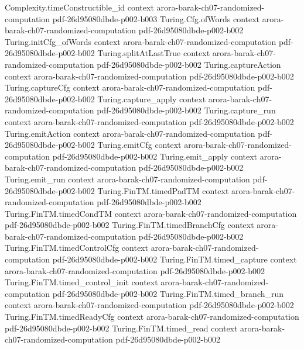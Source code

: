 \begin{theorem}
  {Complexity.timeConstructible_id}
  {context}
  {arora-barak-ch07-randomized-computation}
  {pdf-26d95080dbde-p002-b003}
\proofstep
  {Turing.Cfg.ofWords}
  {context}
  {arora-barak-ch07-randomized-computation}
  {pdf-26d95080dbde-p002-b002}
\proofstep
  {Turing.initCfg_ofWords}
  {context}
  {arora-barak-ch07-randomized-computation}
  {pdf-26d95080dbde-p002-b002}
\proofstep
  {Turing.splitAtLastTrue}
  {context}
  {arora-barak-ch07-randomized-computation}
  {pdf-26d95080dbde-p002-b002}
\proofstep
  {Turing.captureAction}
  {context}
  {arora-barak-ch07-randomized-computation}
  {pdf-26d95080dbde-p002-b002}
\proofstep
  {Turing.captureCfg}
  {context}
  {arora-barak-ch07-randomized-computation}
  {pdf-26d95080dbde-p002-b002}
\proofstep
  {Turing.capture_apply}
  {context}
  {arora-barak-ch07-randomized-computation}
  {pdf-26d95080dbde-p002-b002}
\proofstep
  {Turing.capture_run}
  {context}
  {arora-barak-ch07-randomized-computation}
  {pdf-26d95080dbde-p002-b002}
\proofstep
  {Turing.emitAction}
  {context}
  {arora-barak-ch07-randomized-computation}
  {pdf-26d95080dbde-p002-b002}
\proofstep
  {Turing.emitCfg}
  {context}
  {arora-barak-ch07-randomized-computation}
  {pdf-26d95080dbde-p002-b002}
\proofstep
  {Turing.emit_apply}
  {context}
  {arora-barak-ch07-randomized-computation}
  {pdf-26d95080dbde-p002-b002}
\proofstep
  {Turing.emit_run}
  {context}
  {arora-barak-ch07-randomized-computation}
  {pdf-26d95080dbde-p002-b002}
\proofstep
  {Turing.FinTM.timedPadTM}
  {context}
  {arora-barak-ch07-randomized-computation}
  {pdf-26d95080dbde-p002-b002}
\proofstep
  {Turing.FinTM.timedCondTM}
  {context}
  {arora-barak-ch07-randomized-computation}
  {pdf-26d95080dbde-p002-b002}
\proofstep
  {Turing.FinTM.timedBranchCfg}
  {context}
  {arora-barak-ch07-randomized-computation}
  {pdf-26d95080dbde-p002-b002}
\proofstep
  {Turing.FinTM.timedControlCfg}
  {context}
  {arora-barak-ch07-randomized-computation}
  {pdf-26d95080dbde-p002-b002}
\proofstep
  {Turing.FinTM.timed_capture}
  {context}
  {arora-barak-ch07-randomized-computation}
  {pdf-26d95080dbde-p002-b002}
\proofstep
  {Turing.FinTM.timed_control_init}
  {context}
  {arora-barak-ch07-randomized-computation}
  {pdf-26d95080dbde-p002-b002}
\proofstep
  {Turing.FinTM.timed_branch_run}
  {context}
  {arora-barak-ch07-randomized-computation}
  {pdf-26d95080dbde-p002-b002}
\proofstep
  {Turing.FinTM.timedReadyCfg}
  {context}
  {arora-barak-ch07-randomized-computation}
  {pdf-26d95080dbde-p002-b002}
\proofstep
  {Turing.FinTM.timed_read}
  {context}
  {arora-barak-ch07-randomized-computation}
  {pdf-26d95080dbde-p002-b002}

\end{theorem}
